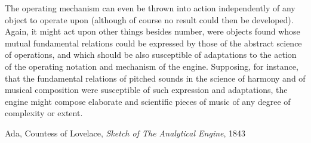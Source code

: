 \begin{schemeregion}
\begin{smallquote}
{The operating mechanism can even be thrown into action independently of any object to operate upon (although of course no result could then be developed). Again, it might act upon other things besides number, were objects found whose mutual fundamental relations could be expressed by those of the abstract science of operations, and which should be also susceptible of adaptations to the action of the operating notation and mechanism of the engine. Supposing, for instance, that the fundamental relations of pitched sounds in the science of harmony and of musical composition were susceptible of such expression and adaptations, the engine might compose elaborate and scientific pieces of music of any degree of complexity or extent. }

\raggedleft Ada, Countess of Lovelace, \emph{Sketch of The Analytical Engine},  1843 %
\end{smallquote} 

\end{schemeregion}
